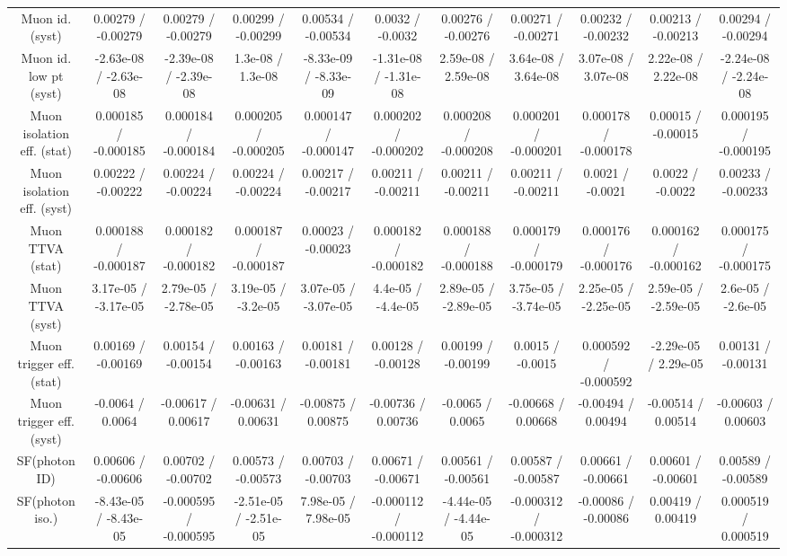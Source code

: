 {\begin{landscape}
\begin{longtable}{@{\extracolsep{\fill}}| *{11}{c|}}
  Muon id. (syst) & 0.00279 / -0.00279 & 0.00279 / -0.00279 & 0.00299 / -0.00299 & 0.00534 / -0.00534 & 0.0032 / -0.0032 & 0.00276 / -0.00276 & 0.00271 / -0.00271 & 0.00232 / -0.00232 & 0.00213 / -0.00213 & 0.00294 / -0.00294 \\ 
  Muon id. low pt (syst) & -2.63e-08 / -2.63e-08 & -2.39e-08 / -2.39e-08 & 1.3e-08 / 1.3e-08 & -8.33e-09 / -8.33e-09 & -1.31e-08 / -1.31e-08 & 2.59e-08 / 2.59e-08 & 3.64e-08 / 3.64e-08 & 3.07e-08 / 3.07e-08 & 2.22e-08 / 2.22e-08 & -2.24e-08 / -2.24e-08 \\ 
  Muon isolation eff. (stat) & 0.000185 / -0.000185 & 0.000184 / -0.000184 & 0.000205 / -0.000205 & 0.000147 / -0.000147 & 0.000202 / -0.000202 & 0.000208 / -0.000208 & 0.000201 / -0.000201 & 0.000178 / -0.000178 & 0.00015 / -0.00015 & 0.000195 / -0.000195 \\ 
  Muon isolation eff. (syst) & 0.00222 / -0.00222 & 0.00224 / -0.00224 & 0.00224 / -0.00224 & 0.00217 / -0.00217 & 0.00211 / -0.00211 & 0.00211 / -0.00211 & 0.00211 / -0.00211 & 0.0021 / -0.0021 & 0.0022 / -0.0022 & 0.00233 / -0.00233 \\ 
  Muon TTVA (stat) & 0.000188 / -0.000187 & 0.000182 / -0.000182 & 0.000187 / -0.000187 & 0.00023 / -0.00023 & 0.000182 / -0.000182 & 0.000188 / -0.000188 & 0.000179 / -0.000179 & 0.000176 / -0.000176 & 0.000162 / -0.000162 & 0.000175 / -0.000175 \\ 
  Muon TTVA (syst) & 3.17e-05 / -3.17e-05 & 2.79e-05 / -2.78e-05 & 3.19e-05 / -3.2e-05 & 3.07e-05 / -3.07e-05 & 4.4e-05 / -4.4e-05 & 2.89e-05 / -2.89e-05 & 3.75e-05 / -3.74e-05 & 2.25e-05 / -2.25e-05 & 2.59e-05 / -2.59e-05 & 2.6e-05 / -2.6e-05 \\ 
  Muon trigger eff. (stat) & 0.00169 / -0.00169 & 0.00154 / -0.00154 & 0.00163 / -0.00163 & 0.00181 / -0.00181 & 0.00128 / -0.00128 & 0.00199 / -0.00199 & 0.0015 / -0.0015 & 0.000592 / -0.000592 & -2.29e-05 / 2.29e-05 & 0.00131 / -0.00131 \\ 
  Muon trigger eff. (syst) & -0.0064 / 0.0064 & -0.00617 / 0.00617 & -0.00631 / 0.00631 & -0.00875 / 0.00875 & -0.00736 / 0.00736 & -0.0065 / 0.0065 & -0.00668 / 0.00668 & -0.00494 / 0.00494 & -0.00514 / 0.00514 & -0.00603 / 0.00603 \\ 
  SF(photon ID) & 0.00606 / -0.00606 & 0.00702 / -0.00702 & 0.00573 / -0.00573 & 0.00703 / -0.00703 & 0.00671 / -0.00671 & 0.00561 / -0.00561 & 0.00587 / -0.00587 & 0.00661 / -0.00661 & 0.00601 / -0.00601 & 0.00589 / -0.00589 \\ 
  SF(photon iso.) & -8.43e-05 / -8.43e-05 & -0.000595 / -0.000595 & -2.51e-05 / -2.51e-05 & 7.98e-05 / 7.98e-05 & -0.000112 / -0.000112 & -4.44e-05 / -4.44e-05 & -0.000312 / -0.000312 & -0.00086 / -0.00086 & 0.00419 / 0.00419 & 0.000519 / 0.000519 \\ 

\end{longtable}
\end{landscape}}
